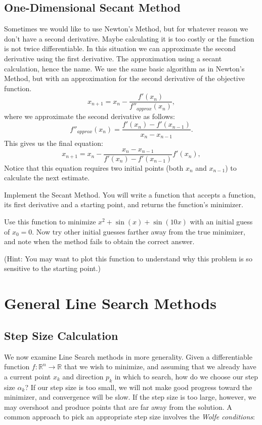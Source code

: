 \subsection*{One-Dimensional Secant Method}
Sometimes we would like to use Newton's Method, but for whatever reason we don't have a second derivative.
Maybe calculating it is too costly or the function is not twice differentiable. In this situation we can
approximate the second derivative using the first derivative. The approximation using a secant calculation,
hence the name. We use the same basic algorithm as in Newton's Method, but with an approximation for the
second derivative of the objective function.
\begin{equation*}
x_{n+1} = x_n - \frac{f'(x_n)}{f''_{approx}(x_n)},
\end{equation*}
where we approximate the second derivative as follows:
\begin{equation*}
f''_{approx}(x_n) = \frac{f'(x_n) - f'(x_{n-1})}{x_n - x_{n-1}}.
\end{equation*}
This gives us the final equation:
\begin{equation*}
x_{n+1} = x_n - \frac{x_n - x_{n-1}}{f'(x_n) - f'(x_{n-1})}f'(x_n),
\end{equation*}
Notice that this equation requires two initial points (both $x_n$ and $x_{n-1}$) to calculate the next
estimate.

\begin{problem}
Implement the Secant Method. You will write a function that accepts a function, its first derivative and a starting point, and returns the function's minimizer.

Use this function to minimize $x^2 + \sin(x) + \sin(10x)$ with an initial guess of $x_0 = 0$.
Now try other initial guesses farther away from the true minimizer, and note when the
method fails to obtain the correct answer.

(Hint: You may want to plot this function to
understand why this problem is so sensitive to the starting point.)
\end{problem}

\section*{General Line Search Methods}
\subsection*{Step Size Calculation}
We now examine Line Search methods in more generality. Given a differentiable function
$f : \mathbb{R}^n \rightarrow \mathbb{R}$ that we wish to minimize, and assuming that
we already have a current point $x_k$ and direction $p_k$ in which to search, how do we
choose our step size $\alpha_k$? If our step size is too small, we will not make good progress
toward the minimizer, and convergence will be slow. If the step size is too large, however,
we may overshoot and produce points that are far away from the solution.
A common approach to pick an appropriate step size involves the \emph{Wolfe conditions}:

